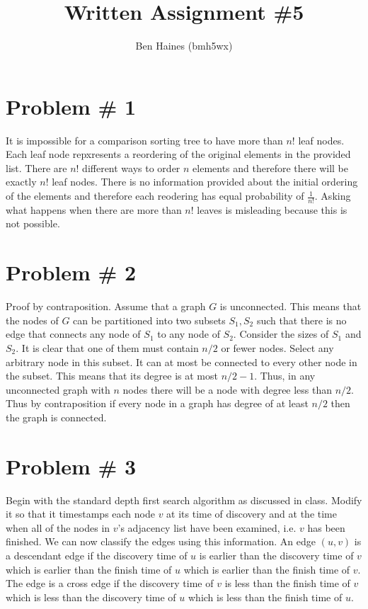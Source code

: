 \documentclass{article}
\begin{document}
\title{Written Assignment \#5}
\author{Ben Haines (bmh5wx)}

\section*{Problem \# 1}
It is impossible for a comparison sorting tree to have more than $n!$ leaf nodes. Each leaf node repxresents a reordering of the original elements in the provided list. There are $n!$ different ways to order $n$ elements and therefore there will be exactly $n!$ leaf nodes. There is no information provided about the initial ordering of the elements and therefore each reodering has equal probability of $\frac{1}{n!}$. Asking what happens when there are more than $n!$ leaves is misleading because this is not possible.

\section*{Problem \# 2}
Proof by contraposition. Assume that a graph $G$ is unconnected. This means that the nodes of $G$ can be partitioned into two subsets $S_1, S_2$ such that there is no edge that connects any node of $S_1$ to any node of $S_2$. Consider the sizes of $S_1$ and $S_2$. It is clear that one of them must contain $n/2$ or fewer nodes. Select any arbitrary node in this subset. It can at most be connected to every other node in the subset. This means that its degree is at most $n/2 - 1$. Thus, in any unconnected graph with $n$ nodes there will be a node with degree less than $n/2$. Thus by contraposition if every node in a graph has degree of at least $n/2$ then the graph is connected. 

\section*{Problem \# 3}
Begin with the standard depth first search algorithm as discussed in class. Modify it so that it timestamps each node $v$ at its time of discovery and at the time when all of the nodes in $v$'s adjacency list have been examined, i.e. $v$ has been finished. We can now classify the edges using this information. An edge $(u, v)$ is a descendant edge if the discovery time of $u$ is earlier than the discovery time of $v$ which is earlier than the finish time of $u$ which is earlier than the finish time of $v$. The edge is a cross edge if the discovery time of $v$ is less than the finish time of $v$ which is less than the discovery time of $u$ which is less than the finish time of $u$. 
\end{document}
